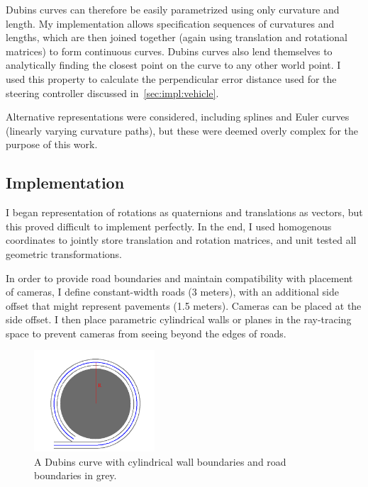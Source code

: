 \documentclass[a4paper,12pt,twoside,openright]{report}
\begin{document}
Dubins curves can therefore be easily parametrized using only curvature and length.
My implementation allows specification sequences of curvatures and lengths, which are
then joined together (again using translation and rotational matrices) to form
continuous curves. Dubins curves also lend themselves to analytically finding the closest point
on the curve to any other world point. I used this property to calculate
the perpendicular error distance used for the steering controller
discussed in~\ref{sec:impl:vehicle}.

Alternative representations were considered, including splines and
Euler curves (linearly varying curvature paths),
but these were deemed overly complex for the purpose of this work.

\subsection{Implementation}

I began representation of rotations as
quaternions and translations as vectors, but this proved difficult to implement perfectly. 
In the end, I used homogenous coordinates to jointly store translation
and rotation matrices, and unit tested all geometric transformations.

In order to provide road boundaries and 
maintain compatibility with placement of cameras, I define
constant-width roads (3 meters), with an additional side offset that
might represent pavements (1.5 meters). Cameras can be placed at the 
side offset. I then place parametric cylindrical walls
or planes in the ray-tracing space to prevent cameras from
seeing beyond the edges of roads.

\begin{figure}[htb]
    \centering
    \includegraphics[width=0.4\textwidth]{figures/dubins_walls.png}
    \caption[Dubins Curve with Boundaries]{A Dubins curve with cylindrical wall boundaries and road boundaries in grey.}
    \label{fig:impl:dubinswalls}
\end{figure}
\end{document}
